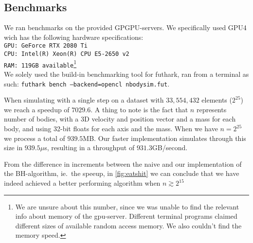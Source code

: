 \subsection{Benchmarks}
We ran benchmarks on the provided GPGPU-servers. We specifically
used GPU4 wich has the following hardware specifications:\\
\texttt{GPU: GeForce RTX 2080 Ti}\\
\texttt{CPU: Intel(R) Xeon(R) CPU E5-2650 v2}\\
\texttt{RAM: 119GB available}\footnote{We are unsure about this number, since we was
unable to find the relevant info about memory of the gpu-server. Different terminal
programs claimed different sizes of available random access memory. We also couldn't
find the memory speed.}\\

We solely used the build-in benchmarking tool for futhark, ran from a terminal
as such: \texttt{futhark bench --backend=opencl nbodysim.fut}.

When simulating with a single step on a dataset with $33,554,432$ elements
($2^{25}$) we reach a speedup of $7029.6$. A thing to note is the fact that
$n$ represents number of bodies, with a 3D velocity and position vector and a
mass for each body, and using 32-bit floats for each axis and the mass. When we
have $n = 2^{25}$ we process a total of $939.5$MB. Our faster implementation
simulates through this size in $939.5\mu$s, resulting in a throughput of
$931.3$GB/second.

\begin{Figure}
  \centering
  \label{fig:eatshit}
\end{Figure}

From the difference in increments between the naive and our implementation of
the BH-algorithm, ie.\ the speeup, in \autoref{fig:eatshit} we can conclude that
we have indeed achieved a better performing algorithm when $n \gtrsim 2^{15}$
